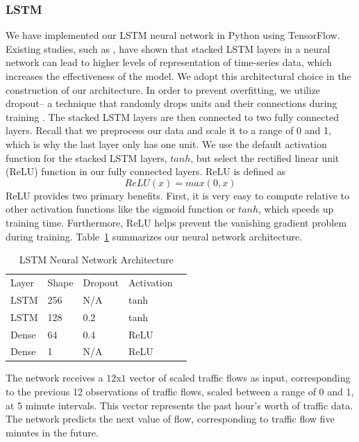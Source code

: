 \documentclass{article}
\begin{document}
\subsubsection{LSTM}
We have implemented our LSTM neural network in Python using TensorFlow. Existing studies, such as \citep{deep_learning}, have shown that stacked LSTM layers in a neural network can lead to higher levels of representation of time-series data, which increases the effectiveness of the model. We adopt this architectural choice in the construction of our architecture. In order to prevent overfitting, we utilize dropout-- a technique that randomly drops units and their connections during training \citep{dropout}. The stacked LSTM layers are then connected to two fully connected layers. Recall that we preprocess our data and scale it to a range of 0 and 1, which is why the last layer only has one unit. We use the default activation function for the stacked LSTM layers, $tanh$, but select the rectified linear unit (ReLU) function in our fully connected layers. ReLU is defined as
\begin{equation}
    ReLU(x) = max(0, x)
\end{equation}
ReLU provides two primary benefits. First, it is very easy to compute relative to other activation functions like the sigmoid function or $tanh$, which speeds up training time. Furthermore, ReLU helps prevent the vanishing gradient problem during training. Table~\ref{tab:lstm} summarizes our neural network architecture. 

\begin{table}[ht]
 \caption{LSTM Neural Network Architecture}
  \centering
  \begin{tabular}{lllll}
    Layer & Shape & Dropout & Activation\\
    LSTM & 256 & N/A & tanh\\
    LSTM & 128 & 0.2 & tanh\\
    Dense & 64 & 0.4 & ReLU\\
    Dense & 1 & N/A & ReLU
  \end{tabular}
  \label{tab:lstm}
\end{table}

The network receives a $12$x$1$ vector of scaled traffic flows as input, corresponding to the previous 12 observations of traffic flows, scaled between a range of 0 and 1, at 5 minute intervals. This vector represents the past hour's worth of traffic data. The network predicts the next value of flow, corresponding to traffic flow five minutes in the future. 
\end{document}
